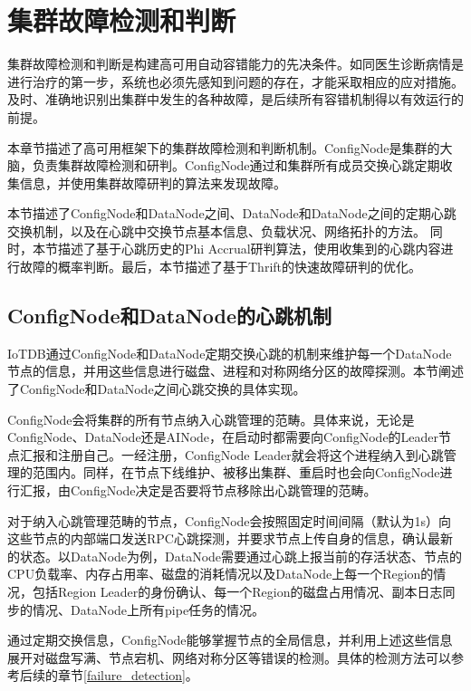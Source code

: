 
\chapter{集群故障检测和判断}

集群故障检测和判断是构建高可用自动容错能力的先决条件。如同医生诊断病情是进行治疗的第一步，系统也必须先感知到问题的存在，才能采取相应的应对措施。及时、准确地识别出集群中发生的各种故障，是后续所有容错机制得以有效运行的前提。

本章节描述了高可用框架下的集群故障检测和判断机制。ConfigNode是集群的大脑，负责集群故障检测和研判。ConfigNode通过和集群所有成员交换心跳定期收集信息，并使用集群故障研判的算法来发现故障。

本节描述了ConfigNode和DataNode之间、DataNode和DataNode之间的定期心跳交换机制，以及在心跳中交换节点基本信息、负载状况、网络拓扑的方法。
同时，本节描述了基于心跳历史的Phi Accrual研判算法，使用收集到的心跳内容进行故障的概率判断。最后，本节描述了基于Thrift的快速故障研判的优化。

\section{ConfigNode和DataNode的心跳机制}

IoTDB通过ConfigNode和DataNode定期交换心跳的机制来维护每一个DataNode节点的信息，并用这些信息进行磁盘、进程和对称网络分区的故障探测。本节阐述了ConfigNode和DataNode之间心跳交换的具体实现。

ConfigNode会将集群的所有节点纳入心跳管理的范畴。具体来说，无论是ConfigNode、DataNode还是AINode，在启动时都需要向ConfigNode的Leader节点汇报和注册自己。一经注册，ConfigNode Leader就会将这个进程纳入到心跳管理的范围内。同样，在节点下线维护、被移出集群、重启时也会向ConfigNode进行汇报，由ConfigNode决定是否要将节点移除出心跳管理的范畴。

对于纳入心跳管理范畴的节点，ConfigNode会按照固定时间间隔（默认为1s）向这些节点的内部端口发送RPC心跳探测，并要求节点上传自身的信息，确认最新的状态。以DataNode为例，DataNode需要通过心跳上报当前的存活状态、节点的CPU负载率、内存占用率、磁盘的消耗情况以及DataNode上每一个Region的情况，包括Region Leader的身份确认、每一个Region的磁盘占用情况、副本日志同步的情况、DataNode上所有pipe任务的情况。

通过定期交换信息，ConfigNode能够掌握节点的全局信息，并利用上述这些信息展开对磁盘写满、节点宕机、网络对称分区等错误的检测。具体的检测方法可以参考后续的章节\ref{failure_detection}。

